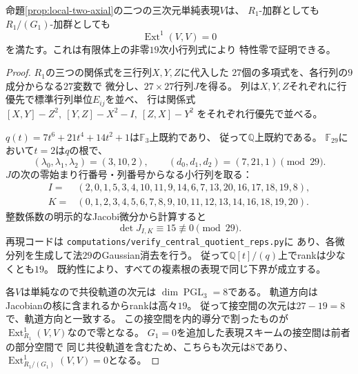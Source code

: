 \begin{proposition}[軸上の三次元表現の無限小剛性と整数小行列式]
\label{prop:quotient-axial-rigidity}
命題\ref{prop:local-two-axial}の二つの三次元単純表現$V$は、
$R_1$-加群としても$R_1/(G_1)$-加群としても
\[
 \operatorname{Ext}^1(V,V)=0
\]
を満たす。これは有限体上の非零$19$次小行列式により
特性零で証明できる。
\end{proposition}
\begin{proof}
$R_1$の三つの関係式を三行列$X,Y,Z$に代入した
$27$個の多項式を、各行列の$9$成分からなる$27$変数で
微分し、$27\times27$行列$J$を得る。
列は$X,Y,Z$それぞれに行優先で標準行列単位$E_{ij}$を並べ、
行は関係式
$[X,Y]-Z^2,\ [Y,Z]-X^2-I,\ [Z,X]-Y^2$
をそれぞれ行優先で並べる。

$q(t)=7t^6+21t^4+14t^2+1$は$\mathbb F_3$上既約であり、
従って$\mathbb Q$上既約である。
$\mathbb F_{29}$において$t=2$は$q$の根で、
\[
 (\lambda_0,\lambda_1,\lambda_2)=(3,10,2),\qquad
 (d_0,d_1,d_2)=(7,21,1)\pmod{29}.
\]
$J$の次の零始まり行番号・列番号からなる小行列を取る：
\[
\begin{split}
 I={}&(2,0,1,5,3,4,10,11,9,14,6,7,13,20,16,17,18,19,8),\\
 K={}&(0,1,2,3,4,5,6,7,8,9,10,11,12,13,14,16,18,19,20).
\end{split}
\]
整数係数の明示的なJacobi微分から計算すると
\[
 \det J_{I,K}\equiv15\not\equiv0\pmod{29}.
\]
再現コードは
\texttt{computations/verify\_central\_quotient\_reps.py}に
あり、各微分列を生成して法$29$のGaussian消去を行う。
従って$\mathbb Q[t]/(q)$上でrankは少なくとも$19$。
既約性により、すべての複素根の表現で同じ下界が成立する。

各$V$は単純なので共役軌道の次元は
$\dim\operatorname{PGL}_3=8$である。
軌道方向はJacobianの核に含まれるからrankは高々$19$。
従って接空間の次元は$27-19=8$で、軌道方向と一致する。
この接空間を内的導分で割ったものが
$\operatorname{Ext}^1_{R_1}(V,V)$なので零となる。
$G_1=0$を追加した表現スキームの接空間は前者の部分空間で
同じ共役軌道を含むため、こちらも次元は$8$であり、
$\operatorname{Ext}^1_{R_1/(G_1)}(V,V)=0$となる。
\end{proof}
